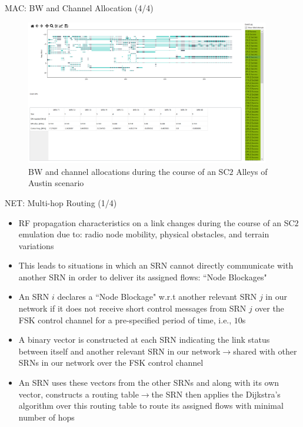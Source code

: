 \documentclass{beamer}
\begin{document}
\begin{frame}{MAC: BW and Channel Allocation (4/4)}
\begin{figure}
    \centering
    \includegraphics[width = 0.95\textwidth]{Alleys_Channel_Alloc.PNG}
    \caption{BW and channel allocations during the course of an SC$2$ Alleys of Austin scenario}
    \label{fig:16}
\end{figure}
\end{frame}
\begin{frame}{NET: Multi-hop Routing (1/4)}
    \footnotesize{\begin{itemize}
        \item RF propagation characteristics on a link changes during the course of an SC$2$ emulation due to: radio node mobility, physical obstacles, and terrain variations
        \item This leads to situations in which an SRN cannot directly communicate with another SRN in order to deliver its assigned flows: ``Node Blockages"
        \item An SRN $i$ declares a ``Node Blockage" w.r.t another relevant SRN $j$ in our network if it does not receive short control messages from SRN $j$ over the FSK control channel for a pre-specified period of time, i.e., $10$s
        \item A binary vector is constructed at each SRN indicating the link status between itself and another relevant SRN in our network$\longrightarrow$shared with other SRNs in our network over the FSK control channel
        \item An SRN uses these vectors from the other SRNs and along with its own vector, constructs a routing table$\longrightarrow$the SRN then applies the Dijkstra's algorithm over this routing table to route its assigned flows with minimal number of hops
    \end{itemize}}
\end{frame}
\end{document}
